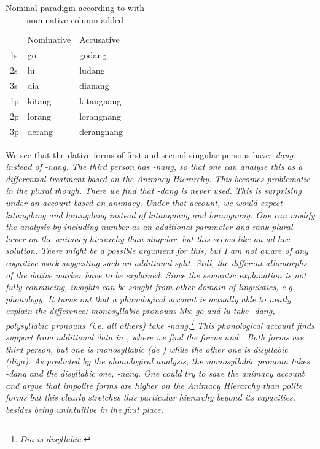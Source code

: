 \documentclass[a4paper,10pt]{article}
\begin{document}
\begin{table}
\begin{tabular}{lllll} 
  & Nominative & Accusative & \\
1s & go & godang  \\
2s & lu & ludang  \\
3s & dia & dianang  \\
1p & kitang & kitangnang  \\
2p & lorang & lorangnang  \\
3p & derang & derangnang  
\end{tabular}
\caption{Nominal paradigm according to \citet{Ansaldo2008genesis} with nominative column added}
\label{tab:Ansaldoparadigm}
\end{table}

We see that the dative forms of first and second singular persons have \em -dang \em instead of \em -nang\em. The third person has \em -nang\em, so that one can analyse this as a differential treatment based on the Animacy Hierarchy. This becomes problematic in the plural though. There we find that \em -dang \em is never used. This is surprising under an account based on animacy. Under that account, we would expect \em *kitangdang \em and \em *lorangdang \em instead of \em kitangnang \em and \em lorangnang\em. One can modify the analysis by including number as an additional parameter and rank plural lower on the animacy hierarchy than singular, but this seems like an ad hoc solution. There might be a possible argument for this, but I am not aware of any cognitive work suggesting such an additional split. Still, the different allomorphs of the dative marker have to be explained. Since the semantic explanation is not fully convincing, insights can be sought from other domain of linguistics, e.g. phonology. It turns out that a phonological account is actually able to neatly explain the difference: monosyllabic pronouns like \em go \em and \em lu \em take \em -dang\em, polysyllabic pronouns (i.e. all others) take \em -nang\em.\footnote{\em Dia \em 
 is disyllabic.
} 
This phonological account finds support from additional data in \citet[225]{Nordhoff2009phd}, where we find the forms  and . Both forms are third person, but one is monosyllabic (\em de \em) while the other one is disyllabic (\em diya\em). As predicted by the phonological analysis, the monosyllabic pronoun takes \em -dang \em and the disyllabic one, \em -nang\em.
One could try to save the animacy account and argue that impolite forms are higher on the Animacy Hierarchy than polite forms but this clearly stretches this particular hierarchy beyond its capacities, besides being unintuitive in the first place.
\end{document}
